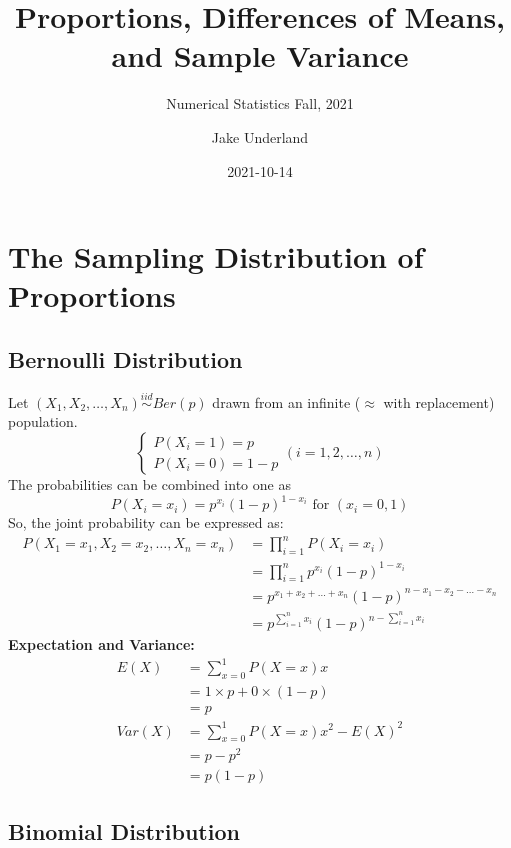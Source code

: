\documentclass[
]{article}
\title{Proportions, Differences of Means, and Sample Variance}
\subtitle{Numerical Statistics Fall, 2021}
\author{Jake Underland}
\date{2021-10-14}
\begin{document}
\maketitle

{
\setcounter{tocdepth}{2}
\tableofcontents
}
\hypertarget{the-sampling-distribution-of-proportions}{%
\section{The Sampling Distribution of
Proportions}\label{the-sampling-distribution-of-proportions}}

\hypertarget{bernoulli-distribution}{%
\subsection{Bernoulli Distribution}\label{bernoulli-distribution}}

Let \((X_1, X_2, \dots, X_n) \stackrel{iid}{\sim}Ber(p)\) drawn from an
infinite (\(\approx\) with replacement) population. \[\begin{cases}
P(X_i = 1) = p  \\
P(X_i=0) = 1 - p
\end{cases}(i = 1, 2, \dots, n)\] The probabilities can be combined into
one as
\[P(X_i = x_i) = p^{x_i} (1-p)^{1 - x_i} \text{ for }(x_i = 0, 1)\] So,
the joint probability can be expressed as: \[\begin{aligned}
P(X_1 = x_1, X_2 = x_2, \dots, X_n = x_n) &= \prod^{n}_{i=1}P(X_i = x_i) \\
&= \prod^{n}_{i=1}p^{x_i} (1-p)^{1 - x_i} \\
&= p^{x_1 + x_2 + \dots + x_n}(1-p)^{n - x_1 - x_2 - \dots - x_n} \\
&= p^{\sum_{i = 1}^nx_i}(1-p)^{n - \sum_{i = 1}^nx_i}
\end{aligned}\] \textbf{Expectation and Variance:}\\
\[\begin{aligned} 
E(X) &= \sum^1_{x=0} P(X = x) x  \\
&= 1 \times p + 0 \times (1-p) \\
&= p \\
Var(X) &= \sum^1_{x=0} P(X = x) x^2 - E(X)^2 \\
&= p - p^2 \\
&= p(1-p)
\end{aligned}\]

\hypertarget{binomial-distribution}{%
\subsection{Binomial Distribution}\label{binomial-distribution}}
\end{document}
